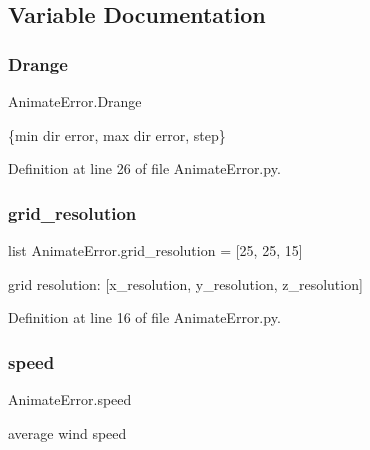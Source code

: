 \subsection{Variable Documentation}
\mbox{\label{namespace_animate_error_a88fe8948bcdf9547a6047170052b1308}} 
\subsubsection{\texorpdfstring{Drange}{Drange}}
{\footnotesize\ttfamily Animate\+Error.\+Drange}



\{min dir error, max dir error, step\} 



Definition at line 26 of file Animate\+Error.\+py.

\mbox{\label{namespace_animate_error_a80b6ca5f039907594eec504621ef9574}} 
\subsubsection{\texorpdfstring{grid\+\_\+resolution}{grid\_resolution}}
{\footnotesize\ttfamily list Animate\+Error.\+grid\+\_\+resolution = \mbox{[}25, 25, 15\mbox{]}}



grid resolution\+: \mbox{[}x\+\_\+resolution, y\+\_\+resolution, z\+\_\+resolution\mbox{]} 



Definition at line 16 of file Animate\+Error.\+py.

\mbox{\label{namespace_animate_error_a7ee7380c6a63ebc4f737cf5d999f9899}} 
\subsubsection{\texorpdfstring{speed}{speed}}
{\footnotesize\ttfamily Animate\+Error.\+speed}



average wind speed 



